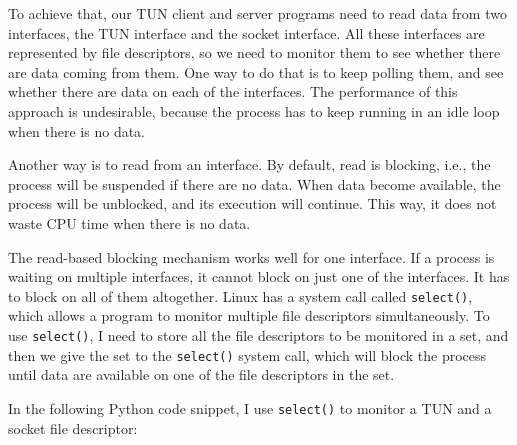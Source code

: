 \documentclass[10pt,a4paper]{article}
\begin{document}
To achieve that, our TUN client and server programs need to read data from two interfaces, the TUN interface and the socket interface. All these interfaces are represented by file descriptors, so we need to monitor them to see whether there are data coming from them. One way to do that is to keep polling them, and see whether there are data on each of the interfaces. The performance of this approach is undesirable, because the process has to keep running in an idle loop when there is no data. \cite{seedlab2024}

Another way is to read from an interface. By default, read is blocking, i.e., the process will be suspended if there are no data. When data become available, the process will be unblocked, and its execution will continue. This way, it does not waste CPU time when there is no data. \cite{seedlab2024}

The read-based blocking mechanism works well for one interface. If a process is waiting on multiple interfaces, it cannot block on just one of the interfaces. It has to block on all of them altogether. Linux has a
system call called \lstinline{select()}, which allows a program to monitor multiple file descriptors simultaneously. To use \lstinline{select()}, I need to store all the file descriptors to be monitored in a set, and then we give the set to the \lstinline{select()} system call, which will block the process until data are available on one of the file descriptors in the set. 

In the following Python code snippet, I use \lstinline{select()} to monitor a TUN and a socket file descriptor: 
\end{document}
